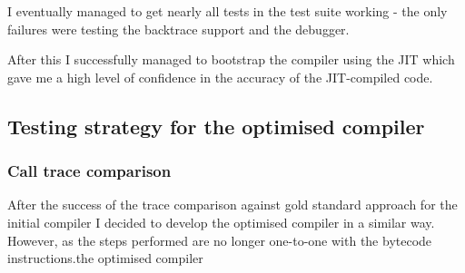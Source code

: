 I eventually managed to get nearly all tests in the test suite working - the only failures were
testing the backtrace support and the debugger.

After this I successfully managed to bootstrap the compiler using the JIT which gave me a high
level
of confidence in the accuracy of the JIT-compiled code.

\subsection{Testing strategy for the optimised compiler}

\subsubsection{Call trace comparison}

After the success of the trace comparison against gold standard approach for the initial compiler I
decided to develop the optimised compiler in a similar way. However, as the steps performed are no
longer
one-to-one with the bytecode instructions.the optimised compiler
